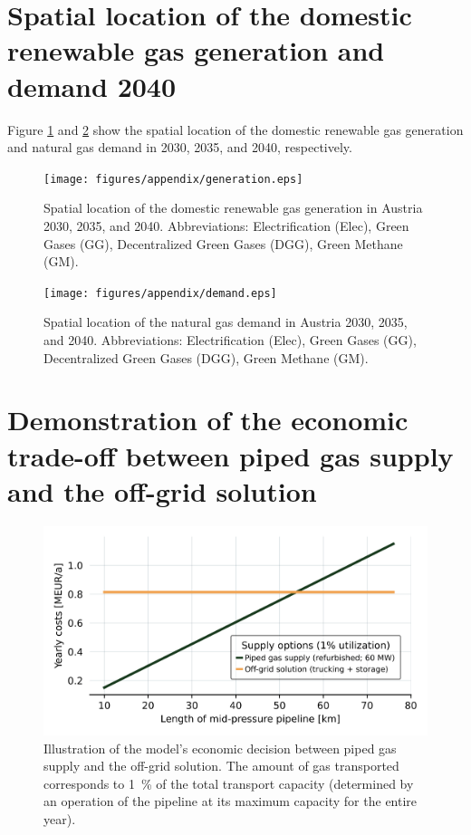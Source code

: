 \documentclass[review]{elsarticle}
\begin{document}
\section{Spatial location of the domestic renewable gas generation and demand 2040}\label{app:visualization}
Figure \ref{generation} and \ref{demand} show the spatial location of the domestic renewable gas generation and natural gas demand in 2030, 2035, and 2040, respectively. 

\begin{figure}[h]
	\centering
	\texttt{[image: figures/appendix/generation.eps]}
	\caption{Spatial location of the domestic renewable gas generation in Austria 2030, 2035, and 2040. Abbreviations: Electrification (Elec), Green Gases (GG), Decentralized Green Gases (DGG), Green Methane (GM).}
	\label{generation}
\end{figure}

\begin{figure}[h]
	\centering
	\texttt{[image: figures/appendix/demand.eps]}
	\caption{Spatial location of the natural gas demand in Austria 2030, 2035, and 2040. Abbreviations: Electrification (Elec), Green Gases (GG), Decentralized Green Gases (DGG), Green Methane (GM).}
	\label{demand}
\end{figure}

\section{Demonstration of the economic trade-off between piped gas supply and the off-grid solution}\label{app_off_grid}

\begin{figure}[h]
	\centering
	\includegraphics[width=1\linewidth]{figures/appendix/Illustration_Trade_Off_Auslastung.png}
	\caption{Illustration of the model's economic decision between piped gas supply and the off-grid solution. The amount of gas transported corresponds to \SI{1}{\%} of the total transport capacity (determined by an operation of the pipeline at its maximum capacity for the entire year).}
	\label{line_and_point}
\end{figure}
\end{document}
